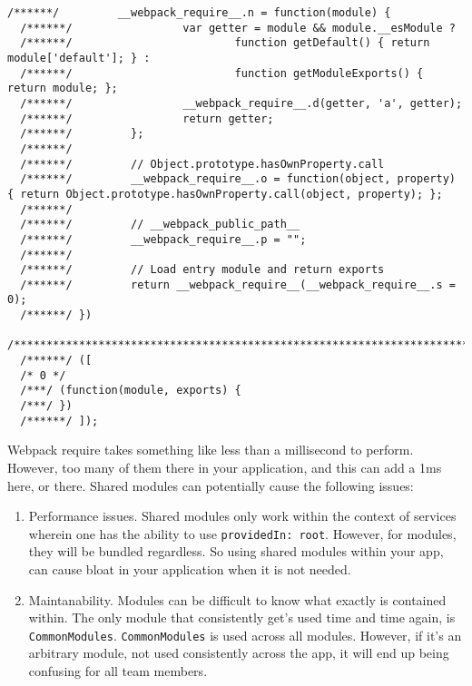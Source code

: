 \begin{lstlisting}[caption=webpack require source code]
  /******/         __webpack_require__.n = function(module) {
  /******/                 var getter = module && module.__esModule ?
  /******/                         function getDefault() { return module['default']; } :
  /******/                         function getModuleExports() { return module; };
  /******/                 __webpack_require__.d(getter, 'a', getter);
  /******/                 return getter;
  /******/         };
  /******/
  /******/         // Object.prototype.hasOwnProperty.call
  /******/         __webpack_require__.o = function(object, property) { return Object.prototype.hasOwnProperty.call(object, property); };
  /******/
  /******/         // __webpack_public_path__
  /******/         __webpack_require__.p = "";
  /******/
  /******/         // Load entry module and return exports
  /******/         return __webpack_require__(__webpack_require__.s = 0);
  /******/ })
  /************************************************************************/
  /******/ ([
  /* 0 */
  /***/ (function(module, exports) {
  /***/ })
  /******/ ]);  
\end{lstlisting}

Webpack require takes something like less than a millisecond to perform. 
However, too many of them there in your application, and this can add a 1ms
here, or there. Shared modules can potentially cause the following issues: 
\begin{enumerate}
  \item Performance issues. Shared modules only work within the context of 
services wherein one has the ability to use \lstinline{providedIn: root}. 
However, for modules, they will be bundled regardless. So using shared 
modules within your app, can cause bloat in your application when it is 
not needed. 
  \item Maintanability. Modules can be difficult to know what exactly is 
  contained within. The only module that consistently get's used time and time
  again, is \lstinline{CommonModules}. \lstinline{CommonModules} is used 
  across all modules. However, if it's an arbitrary module, not used
  consistently across the app, it will end up being confusing for all team
  members. 
\end{enumerate}

